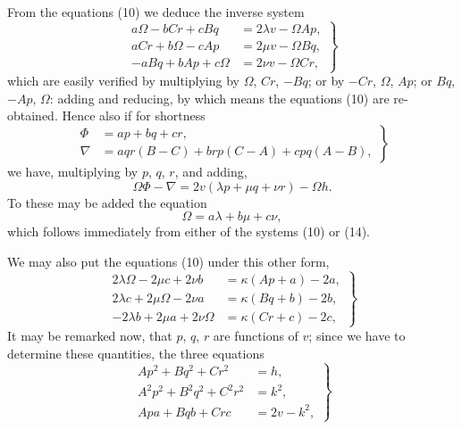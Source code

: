 \documentclass[11pt]{article}
\begin{document}
From the equations (10) we deduce the inverse system
\[
\left.
\begin{aligned}
a\Omega-bCr+cBq&=2\lambda v-\Omega Ap,\\
aCr+b\Omega-cAp&=2\mu v-\Omega Bq,\\
-aBq+bAp+c\Omega&=2\nu v-\Omega Cr,
\end{aligned}
\right\}\tag{14}
\]
which are easily verified by multiplying by $\Omega$, $Cr$, $-Bq$; or by $-Cr$,
$\Omega$, $Ap$; or $Bq$, $-Ap$, $\Omega$: adding and reducing, by which means the
equations (10) are re-obtained. Hence also if for shortness
\[
\left.
\begin{aligned}
\Phi&=ap+bq+cr,\\
\nabla&=aqr(B-C)+brp(C-A)+cpq(A-B),
\end{aligned}
\right\}\tag{15}
\]
we have, multiplying by $p$, $q$, $r$, and adding,
\[
\Omega\Phi-\nabla=2v(\lambda p+\mu q+\nu r)-\Omega h.\tag{16}
\]
To these may be added the equation
\[
\Omega=a\lambda+b\mu+c\nu,\tag{17}
\]
which follows immediately from either of the systems (10) or (14).

We may also put the equations (10) under this other form,
\[
\left.
\begin{aligned}
2\lambda\Omega-2\mu c+2\nu b&=\kappa(Ap+a)-2a,\\
2\lambda c+2\mu\Omega-2\nu a&=\kappa(Bq+b)-2b,\\
-2\lambda b+2\mu a+2\nu\Omega&=\kappa(Cr+c)-2c,
\end{aligned}
\right\}\tag{10 bis}
\]
It may be remarked now, that $p$, $q$, $r$ are functions of $v$; since we have to
determine these quantities, the three equations
\[
\left.
\begin{aligned}
Ap^2+Bq^2+Cr^2&=h,\\
A^2p^2+B^2q^2+C^2r^2&=k^2,\\
Apa+Bqb+Crc&=2v-k^2,
\end{aligned}
\right\}\tag{18}
\]
\end{document}
